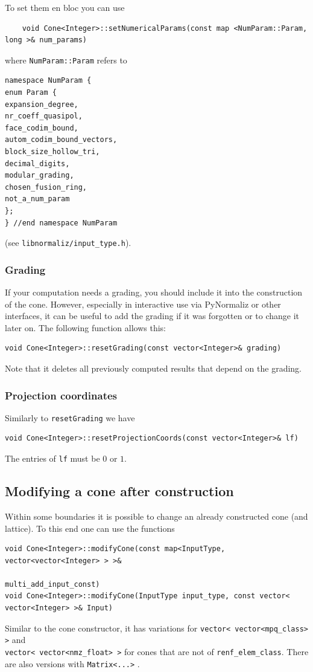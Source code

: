 \begin{small}
To set them en bloc you can use
\begin{Verbatim}
	void Cone<Integer>::setNumericalParams(const map <NumParam::Param, long >& num_params)
\end{Verbatim}
where \verb|NumParam::Param| refers to
\begin{Verbatim}
namespace NumParam {
enum Param {
expansion_degree,
nr_coeff_quasipol,
face_codim_bound,
autom_codim_bound_vectors,
block_size_hollow_tri,
decimal_digits,
modular_grading,
chosen_fusion_ring,
not_a_num_param
};
} //end namespace NumParam
\end{Verbatim}
(see \verb|libnormaliz/input_type.h|).

\subsubsection{Grading}

If your computation needs a grading, you should include it into the construction of the cone. However, especially in interactive use via PyNormaliz or other interfaces, it can be useful to add the grading if it was forgotten or to change it later on. The following function allows this:

\begin{Verbatim}
void Cone<Integer>::resetGrading(const vector<Integer>& grading)
\end{Verbatim}

Note that it deletes all previously computed results that depend on the grading.

\subsubsection{Projection coordinates}

Similarly to  \verb|resetGrading| we have
\begin{Verbatim}
void Cone<Integer>::resetProjectionCoords(const vector<Integer>& lf)
\end{Verbatim}
The entries of \verb|lf| must be $0$ or $1$.

\subsection{Modifying a cone after construction}\label{Modify}

Within some boundaries it is possible to change an already constructed cone (and lattice). To this end one can use the functions
\begin{Verbatim}
void Cone<Integer>::modifyCone(const map<InputType, vector<vector<Integer> > >& 
                                                           multi_add_input_const)
void Cone<Integer>::modifyCone(InputType input_type, const vector< vector<Integer> >& Input)
\end{Verbatim}
Similar to the cone constructor, it has variations for \verb|vector< vector<mpq_class> >| and\\ \verb|vector< vector<nmz_float> >| for cones that are not of \verb|renf_elem_class|. There are also versions with \verb|Matrix<...>| .


\end{small}
